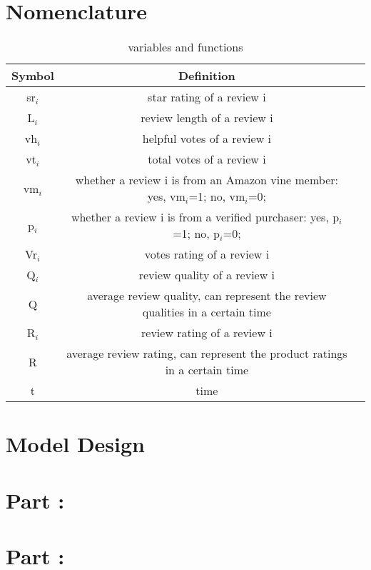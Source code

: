 \documentclass{mcmthesis}
\begin{document}
\section{Nomenclature}
\begin{table}[h]
  \centering
  \begin{tabular}{ccc}
    \hline
    Symbol & Definition\\
    \hline
    sr$_{i}$ & star rating of a review i\\
    \hline
	L$_{i}$ & review length of a review i\\
    \hline
	vh$_{i}$ & helpful votes of a review i\\
    \hline
	vt$_{i}$ & total votes of a review i\\
    \hline
	vm$_{i}$ & whether a review i is from an Amazon vine member: yes, vm$_{i}$=1; no, vm$_{i}$=0;\\
    \hline
	p$_{i}$ & whether a review i is from a verified purchaser: yes, p$_{i}$=1; no, p$_{i}$=0;\\
    \hline
	Vr$_{i}$ & votes rating of a review i\\
    \hline
	Q$_{i}$ & review quality of a review i\\
    \hline
	Q & average review quality, can represent the review qualities in a certain time\\
    \hline
	R$_{i}$ & review rating of a review i\\
    \hline
	R & average review rating, can represent the product ratings in a certain time\\
    \hline
	t & time\\
	\hline
  \end{tabular}
  \caption{variables and functions}
\end{table}

\section{ Model Design }

\section{ Part \uppercase\expandafter{}:  }

\section{ Part \uppercase\expandafter{}:  }
\end{document}
